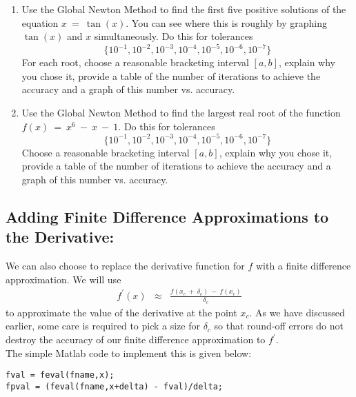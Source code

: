\documentclass[11pt]{SelfArxOneColBMN}
\begin{document}
\begin{enumerate}
\item Use the Global Newton Method to find the first five 
      positive solutions of the
      equation $x \: = \: \tan(x)$.  You can see where this is
      roughly by graphing $\tan(x)$ and $x$ simultaneously.
      Do this for tolerances \\
      $$\{10^{-1}, 10^{-2}, 10^{-3}, 10^{-4}, 10^{-5}, 10^{-6}, 10^{-7}\}$$
      For each root, choose a reasonable bracketing interval $[a,b]$,
      explain why you chose it,
      provide a table of the number of iterations to achieve the
      accuracy and a graph of this number vs. accuracy.
\item Use the Global Newton Method to find the largest real root of the function
      $f(x) \: = \: x^6 \: - \: x \: - \: 1$. 
      Do this for tolerances \\
      $$\{10^{-1}, 10^{-2}, 10^{-3}, 10^{-4}, 10^{-5}, 10^{-6}, 10^{-7}\}$$
      Choose a reasonable bracketing interval $[a,b]$,
      explain why you chose it,
      provide a table of the number of iterations to achieve the
      accuracy and a graph of this number vs. accuracy.     
\end{enumerate}

\subsection{Adding Finite Difference Approximations to the Derivative:}

We can also choose to replace the derivative function for
$f$ with a finite difference approximation.  We will use
\begin{eqnarray*}
f^\prime(x) &\approx& \frac{f(x_c \: + \: \delta_c) \: - \: f(x_c)}{\delta_c}
\end{eqnarray*}
\noindent
to approximate the value of the derivative at the point $x_c$.
As we have discussed earlier, some care is required to pick a 
size for $\delta_c$ so that round-off errors do not destroy the accuracy of
our finite difference approximation to $f^\prime$.\\

\noindent
The simple Matlab code to implement this is given below:

\singlespacing
{}
\begin{lstlisting}
fval = feval(fname,x);
fpval = (feval(fname,x+delta) - fval)/delta;
\end{lstlisting}
\lstset{fancyvrb=false}
\onehalfspacing
\end{document}
